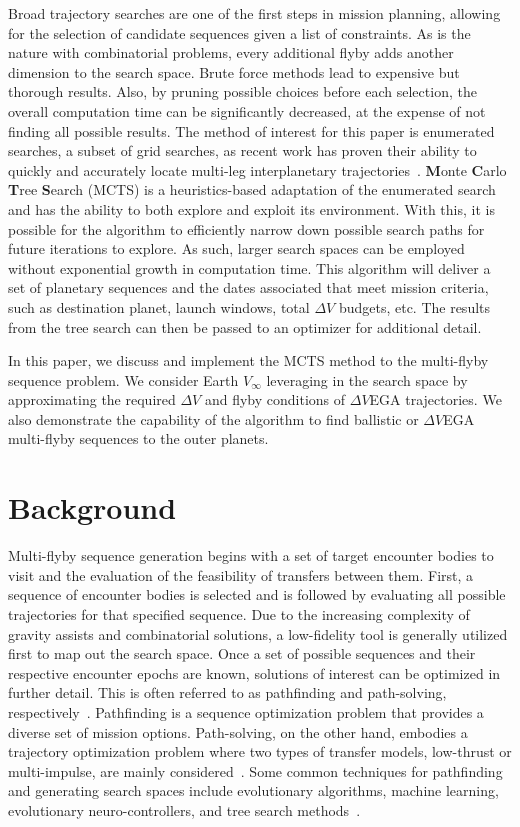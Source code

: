 \documentclass[letterpaper, paper,11pt]{AAS}	%
\begin{document}
Broad trajectory searches are one of the first steps in mission planning, allowing for the selection of candidate sequences given a list of constraints. As is the nature with combinatorial problems, every additional flyby adds another dimension to the search space. Brute force methods lead to expensive but thorough results. Also, by pruning possible choices before each selection, the overall computation time can be significantly decreased, at the expense of not finding all possible results. The method of interest for this paper is enumerated searches, a subset of grid searches, as recent work has proven their ability to quickly and accurately locate multi-leg interplanetary trajectories~\cite{Hennes2015}. \textbf{M}onte \textbf{C}arlo \textbf{T}ree \textbf{S}earch (MCTS) is a heuristics-based adaptation of the enumerated search and has the ability to both explore and exploit its environment. With this, it is possible for the algorithm to efficiently narrow down possible search paths for future iterations to explore. As such, larger search spaces can be employed without exponential growth in computation time. This algorithm will deliver a set of planetary sequences and the dates associated that meet mission criteria, such as destination planet, launch windows, total $\Delta V$ budgets, etc. The results from the tree search can then be passed to an optimizer for additional detail.

In this paper, we discuss and implement the MCTS method to the multi-flyby sequence problem. We consider Earth $V_\infty$ leveraging in the search space by approximating the required $\Delta V$ and flyby conditions of $\Delta V$EGA trajectories. We also demonstrate the capability of the algorithm to find ballistic or $\Delta V$EGA multi-flyby sequences to the outer planets.

\section*{Background}

Multi-flyby sequence generation begins with a set of target encounter bodies to visit and the evaluation of the feasibility of transfers between them. First, a sequence of encounter bodies is selected and is followed by evaluating all possible trajectories for that specified sequence. Due to the increasing complexity of gravity assists and combinatorial solutions, a low-fidelity tool is generally utilized first to map out the search space. Once a set of possible sequences and their respective encounter epochs are known, solutions of interest can be optimized in further detail. This is often referred to as pathfinding and path-solving, respectively~\cite{Hughes2016}. Pathfinding is a sequence optimization problem that provides a diverse set of mission options. Path-solving, on the other hand, embodies a trajectory optimization problem where two types of transfer models, low-thrust or multi-impulse, are mainly considered~\cite{Li2019}. Some common techniques for pathfinding and generating search spaces include evolutionary algorithms, machine learning, evolutionary neuro-controllers, and tree search methods~\cite{Izzo2019}.
\end{document}
